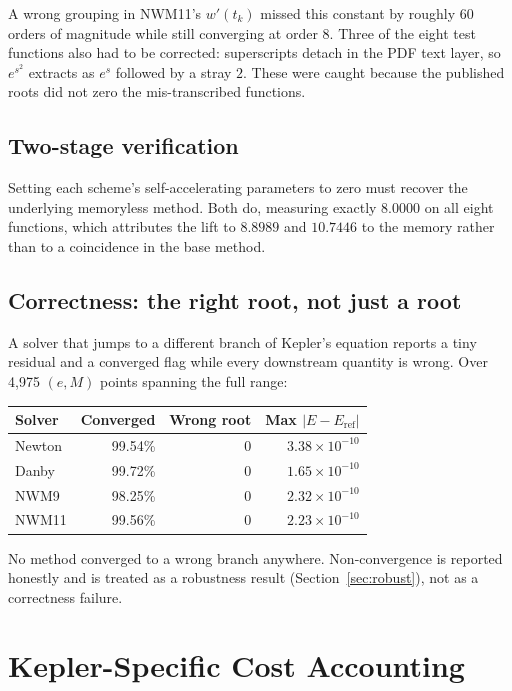 \documentclass[11pt,a4paper]{article}
\begin{document}
A wrong grouping in NWM11's $w'(t_k)$ missed this constant by roughly 60
orders of magnitude while still converging at order 8. Three of the eight
test functions also had to be corrected: superscripts detach in the PDF
text layer, so $e^{s^2}$ extracts as $e^{s}$ followed by a stray $2$.
These were caught because the published roots did not zero the
mis-transcribed functions.

\subsection{Two-stage verification}

Setting each scheme's self-accelerating parameters to zero must recover
the underlying memoryless method. Both do, measuring exactly $8.0000$ on
all eight functions, which attributes the lift to $8.8989$ and $10.7446$
to the memory rather than to a coincidence in the base method.

\subsection{Correctness: the right root, not just a root}

A solver that jumps to a different branch of Kepler's equation reports a
tiny residual and a converged flag while every downstream quantity is
wrong. Over 4{,}975 $(e,M)$ points spanning the full range:

\begin{center}
\small
\begin{tabular}{@{}lrrr@{}}
\toprule
\textbf{Solver} & \textbf{Converged} & \textbf{Wrong root} & \textbf{Max $|E-E_{\mathrm{ref}}|$} \\
\midrule
Newton & 99.54\% & 0 & $3.38\times10^{-10}$ \\
Danby  & 99.72\% & 0 & $1.65\times10^{-10}$ \\
NWM9   & 98.25\% & 0 & $2.32\times10^{-10}$ \\
NWM11  & 99.56\% & 0 & $2.23\times10^{-10}$ \\
\bottomrule
\end{tabular}
\end{center}

No method converged to a wrong branch anywhere. Non-convergence is
reported honestly and is treated as a robustness result
(Section~\ref{sec:robust}), not as a correctness failure.

\section{Kepler-Specific Cost Accounting}
\label{sec:cost}
\end{document}
